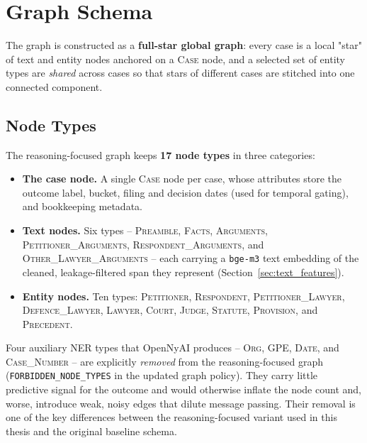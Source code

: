 \section{Graph Schema}
\label{sec:graph_schema}

The graph is constructed as a \textbf{full-star global graph}: every
case is a local "star" of text and entity nodes anchored on a
\textsc{Case} node, and a selected set of entity types are
\emph{shared} across cases so that stars of different cases are
stitched into one connected component.

\subsection{Node Types}

The reasoning-focused graph keeps \textbf{17 node types} in three
categories:

\begin{itemize}
  \item \textbf{The case node.} A single \textsc{Case} node per case,
    whose attributes store the outcome label, bucket, filing and
    decision dates (used for temporal gating), and bookkeeping
    metadata.
  \item \textbf{Text nodes.} Six types -- \textsc{Preamble},
    \textsc{Facts}, \textsc{Arguments},
    \textsc{Petitioner\_Arguments}, \textsc{Respondent\_Arguments},
    and \textsc{Other\_Lawyer\_Arguments} -- each carrying a
    \texttt{bge-m3} text embedding of the cleaned, leakage-filtered
    span they represent (Section~\ref{sec:text_features}).
  \item \textbf{Entity nodes.} Ten types: \textsc{Petitioner},
    \textsc{Respondent}, \textsc{Petitioner\_Lawyer},
    \textsc{Defence\_Lawyer}, \textsc{Lawyer}, \textsc{Court},
    \textsc{Judge}, \textsc{Statute}, \textsc{Provision}, and
    \textsc{Precedent}.
\end{itemize}

Four auxiliary NER types that OpenNyAI produces -- \textsc{Org},
\textsc{GPE}, \textsc{Date}, and \textsc{Case\_Number} -- are
explicitly \emph{removed} from the reasoning-focused graph
(\texttt{FORBIDDEN\_NODE\_TYPES} in the updated graph policy). They
carry little predictive signal for the outcome and would otherwise
inflate the node count and, worse, introduce weak, noisy edges that
dilute message passing. Their removal is one of the key differences
between the reasoning-focused variant used in this thesis and the
original baseline schema.

